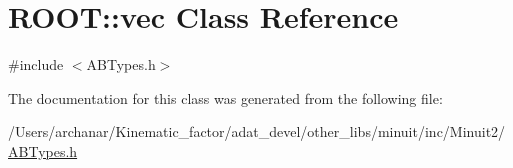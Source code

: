 \hypertarget{classROOT_1_1Minuit2_1_1vec}{}\section{R\+O\+OT\+:\+:vec Class Reference}
\label{classROOT_1_1Minuit2_1_1vec}


{\ttfamily \#include $<$A\+B\+Types.\+h$>$}



The documentation for this class was generated from the following file\+:\begin{DoxyCompactItemize}
\item 
/\+Users/archanar/\+Kinematic\+\_\+factor/adat\+\_\+devel/other\+\_\+libs/minuit/inc/\+Minuit2/\mbox{\hyperlink{other__libs_2minuit_2inc_2Minuit2_2ABTypes_8h}{A\+B\+Types.\+h}}\end{DoxyCompactItemize}
